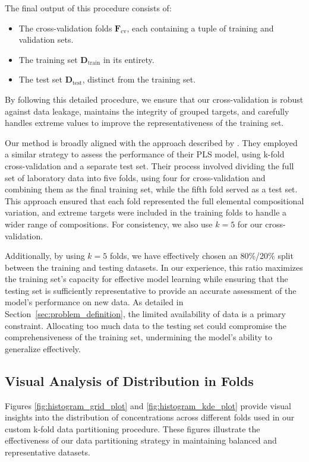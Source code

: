 The final output of this procedure consists of:
\begin{itemize}
    \item The cross-validation folds \(\mathbf{F}_\text{cv}\), each containing a tuple of training and validation sets.
    \item The training set \(\mathbf{D}_\text{train}\) in its entirety.
    \item The test set \(\mathbf{D}_\text{test}\), distinct from the training set.
\end{itemize}

By following this detailed procedure, we ensure that our cross-validation is robust against data leakage, maintains the integrity of grouped targets, and carefully handles extreme values to improve the representativeness of the training set.

Our method is broadly aligned with the approach described by \citet{andersonImprovedAccuracyQuantitative2017}.
They employed a similar strategy to assess the performance of their PLS model, using k-fold cross-validation and a separate test set.
Their process involved dividing the full set of laboratory data into five folds, using four for cross-validation and combining them as the final training set, while the fifth fold served as a test set.
This approach ensured that each fold represented the full elemental compositional variation, and extreme targets were included in the training folds to handle a wider range of compositions.
For consistency, we also use \(k=5\) for our cross-validation.

Additionally, by using $k=5$ folds, we have effectively chosen an 80\%/20\% split between the training and testing datasets.
In our experience, this ratio maximizes the training set's capacity for effective model learning while ensuring that the testing set is sufficiently representative to provide an accurate assessment of the model's performance on new data.
As detailed in Section~\ref{sec:problem_definition}, the limited availability of data is a primary constraint.
Allocating too much data to the testing set could compromise the comprehensiveness of the training set, undermining the model's ability to generalize effectively.

\subsection{Visual Analysis of  Distribution in Folds}

Figures \ref{fig:histogram_grid_plot} and \ref{fig:histogram_kde_plot} provide visual insights into the distribution of  concentrations across different folds used in our custom k-fold data partitioning procedure.
These figures illustrate the effectiveness of our data partitioning strategy in maintaining balanced and representative datasets.

